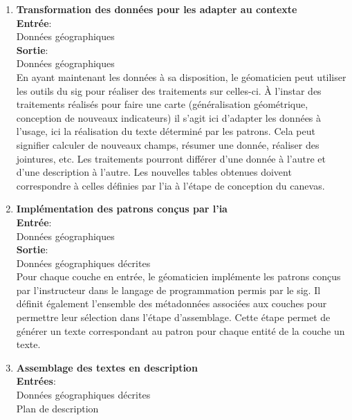 \begin{enumerate}
    \item \textbf{Transformation des données pour les adapter au contexte}\\
            \textbf{Entrée}:\\
            \hspace*{1cm}Données géographiques\\
            \textbf{Sortie}:\\
            \hspace*{1cm}Données géographiques\\
            En ayant maintenant les données à sa disposition, le géomaticien peut utiliser les outils du \gls{sig} pour réaliser des traitements sur celles-ci. À l’instar des traitements réalisés pour faire une carte (généralisation géométrique, conception de nouveaux indicateurs) il s’agit ici d’adapter les données à l’usage, ici la réalisation du texte déterminé par les patrons. Cela peut signifier calculer de nouveaux champs, résumer une donnée, réaliser des jointures, etc. Les traitements pourront différer d’une donnée à l’autre et d’une description à l’autre. Les nouvelles tables obtenues doivent correspondre à celles définies par l’\gls{ia} à l’étape de conception du canevas.
    \item \textbf{Implémentation des patrons conçus par l’\gls{ia}}\\
        \textbf{Entrée}:\\ 
        \hspace*{1cm}Données géographiques\\
        \textbf{Sortie}:\\
        \hspace*{1cm}Données géographiques décrites\\
        Pour chaque couche en entrée, le géomaticien implémente les patrons conçus par l’instructeur dans le langage de programmation permis par le \gls{sig}. Il définit également l’ensemble des métadonnées associées aux couches pour permettre leur sélection dans l’étape d’assemblage. Cette étape permet de générer un texte correspondant au patron pour chaque entité de la couche un texte.
    \item \textbf{Assemblage des textes en description}\\
        \textbf{Entrées}:\\
        \hspace*{1cm}Données géographiques décrites\\
        \hspace*{1cm}Plan de description \\

\end{enumerate}
